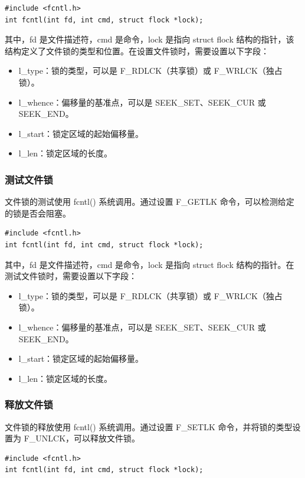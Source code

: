 \documentclass[12pt, a4paper, oneside]{ctexbook}
\numberwithin{figure}{section}
\begin{document}
\begin{verbatim}
#include <fcntl.h>
int fcntl(int fd, int cmd, struct flock *lock);
\end{verbatim}

其中，fd 是文件描述符，cmd 是命令，lock 是指向 struct flock 结构的指针，该结构定义了文件锁的类型和位置。在设置文件锁时，需要设置以下字段：

\begin{itemize}
\item l_type：锁的类型，可以是 F_RDLCK（共享锁）或 F_WRLCK（独占锁）。
\item l_whence：偏移量的基准点，可以是 SEEK_SET、SEEK_CUR 或 SEEK_END。
\item l_start：锁定区域的起始偏移量。
\item l_len：锁定区域的长度。
\end{itemize}

\subsubsection{测试文件锁}

文件锁的测试使用 fcntl() 系统调用。通过设置 F_GETLK 命令，可以检测给定的锁是否会阻塞。

\begin{verbatim}
#include <fcntl.h>
int fcntl(int fd, int cmd, struct flock *lock);
\end{verbatim}

其中，fd 是文件描述符，cmd 是命令，lock 是指向 struct flock 结构的指针。在测试文件锁时，需要设置以下字段：

\begin{itemize}
\item l_type：锁的类型，可以是 F_RDLCK（共享锁）或 F_WRLCK（独占锁）。
\item l_whence：偏移量的基准点，可以是 SEEK_SET、SEEK_CUR 或 SEEK_END。
\item l_start：锁定区域的起始偏移量。
\item l_len：锁定区域的长度。
\end{itemize}

\subsubsection{释放文件锁}

文件锁的释放使用 fcntl() 系统调用。通过设置 F_SETLK 命令，并将锁的类型设置为 F_UNLCK，可以释放文件锁。

\begin{verbatim}
#include <fcntl.h>
int fcntl(int fd, int cmd, struct flock *lock);
\end{verbatim}
\end{document}
